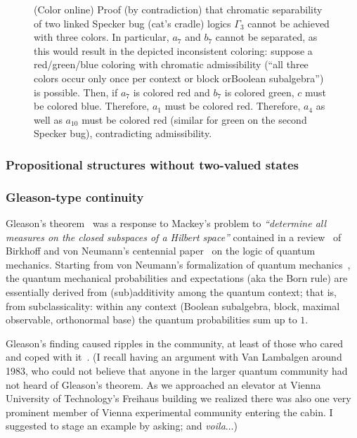 \begin{figure}
\caption{\label{2017-b-f-twobugschromaticsep} (Color online) Proof (by contradiction) that chromatic separability
of two linked Specker bug (cat's cradle) logics $\Gamma_3$ cannot be achieved with three colors.
In particular, $a_7$ and $b_7$ cannot be separated, as this would result in the depicted inconsistent coloring:
suppose a red/green/blue coloring  with chromatic admissibility (``all three colors occur only once per context or block orBoolean subalgebra'')
is possible.
Then, if
$a_7$ is colored red
and
$b_7$ is colored green,
$c$ must be colored blue.
Therefore,
$a_1$ must be colored red.
Therefore,
$a_4$ as well as $a_{10}$
must be colored red (similar for green on the second Specker bug),
contradicting admissibility.
}
\end{figure}




\subsubsection{Propositional structures without two-valued states}
\label{2017-b-c-lwtvs}
\label{2011-m-KST}




\subsubsection*{Gleason-type continuity}

Gleason's theorem~\cite{Gleason} was a response to Mackey's
problem to {\em ``determine all measures on the closed subspaces of a Hilbert space''} contained in a review~\cite{ma-57} of
Birkhoff and von Neumann's centennial paper~\cite{birkhoff-36} on the logic of quantum mechanics.
Starting from von Neumann's formalization of quantum mechanics~\cite{v-neumann-49,v-neumann-55},
the quantum mechanical probabilities and expectations
(aka the Born rule)
are essentially derived from (sub)additivity
among the quantum context; that is, from subclassicality:
within any context (Boolean subalgebra, block, maximal observable, orthonormal base)
the quantum probabilities sum up to $1$.

Gleason's finding caused ripples in the community,
at least of those who cared and coped with
it~\cite{ZirlSchl-65,kamber65,bell-66,kochen1,c-k-m,r:dvur-93,pitowsky:218,rich-bridge}.
(I recall having an argument with Van Lambalgen around 1983, who could not believe that anyone in the larger quantum community
had not heard of Gleason's theorem.
As we approached an elevator at Vienna University of Technology's Freihaus building we realized there was also one very prominent
member of Vienna experimental community entering the cabin.
I suggested to stage an example by asking; and {\em voila}$\ldots$)

